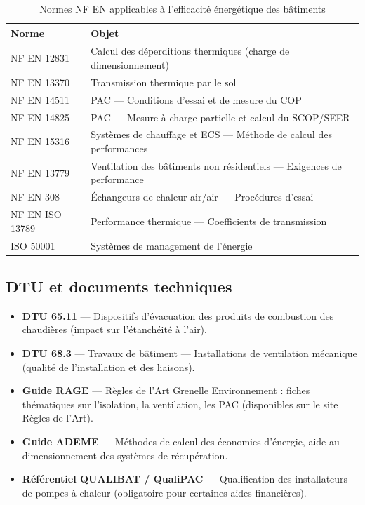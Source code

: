 \begin{table}[H]
  \centering
  \begin{tabularx}{\linewidth}{lX}
    \toprule
    Norme & Objet \\
    \midrule
    NF EN 12831 & Calcul des déperditions thermiques (charge de dimensionnement) \\
    NF EN 13370 & Transmission thermique par le sol \\
    NF EN 14511 & PAC — Conditions d'essai et de mesure du COP \\
    NF EN 14825 & PAC — Mesure à charge partielle et calcul du SCOP/SEER \\
    NF EN 15316 & Systèmes de chauffage et ECS — Méthode de calcul des performances \\
    NF EN 13779 & Ventilation des bâtiments non résidentiels — Exigences de performance \\
    NF EN 308 & Échangeurs de chaleur air/air — Procédures d'essai \\
    NF EN ISO 13789 & Performance thermique — Coefficients de transmission \\
    ISO 50001 & Systèmes de management de l'énergie \\
    \bottomrule
  \end{tabularx}
  \caption{Normes NF EN applicables à l'efficacité énergétique des bâtiments}
\end{table}

\subsection{DTU et documents techniques}

\begin{itemize}
  \item \textbf{DTU 65.11} — Dispositifs d'évacuation des produits de combustion des chaudières (impact sur l'étanchéité à l'air).
  \item \textbf{DTU 68.3} — Travaux de bâtiment — Installations de ventilation mécanique (qualité de l'installation et des liaisons).
  \item \textbf{Guide RAGE} — Règles de l'Art Grenelle Environnement : fiches thématiques sur l'isolation, la ventilation, les PAC (disponibles sur le site Règles de l'Art).
  \item \textbf{Guide ADEME} — Méthodes de calcul des économies d'énergie, aide au dimensionnement des systèmes de récupération.
  \item \textbf{Référentiel QUALIBAT / QualiPAC} — Qualification des installateurs de pompes à chaleur (obligatoire pour certaines aides financières).
\end{itemize}

